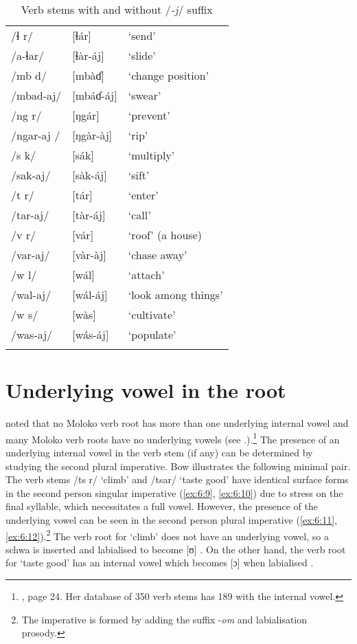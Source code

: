 \begin{table}
\begin{tabular}{lll}
/ɬ r/ & [ɬár] & ‘send’\\
/a-ɬar/ & [ɬàr-áj] & ‘slide’\\

/mb d/ & [mbàɗ] & ‘change position’\\
/mbad-aj/ & [mbáɗ-áj] & ‘swear’\\

/ng r/ & [ŋgár] & ‘prevent’\\
/ngar-aj / & [ŋgàr-àj] & ‘rip’\\

/s k/ & [sák] & ‘multiply’\\
/sak-aj/ & [sàk-áj] & ‘sift’\\

/t r/ & [tár] & ‘enter’\\
/tar-aj/ & [tàr-áj] & ‘call’\\

/v r/ & [vár] & ‘roof’ (a house)\\
/var-aj/ & [vàr-àj] & ‘chase away’\\

/w l/ & [wál] & ‘attach’\\
/wal-aj/ & [wál-áj] & ‘look among things’\\

/w s/ & [wàs] & ‘cultivate’\\
/was-aj/ & [wás-áj] & ‘populate’\\
\lspbottomrule
\end{tabular}
\caption{Verb stems with and without /\textit{-j}/ suffix\label{tab:40}}
\end{table}

\section{Underlying vowel in the root}\label{sec:6.4}
\hypertarget{RefHeading1211961525720847}{}
\largerpage \citet{Bow1997c} noted that no Moloko verb root has more than one underlying internal vowel and many Moloko verb roots have no underlying vowels (see .).\footnote{\citealt{Bow1997c}, page 24. Her database of 350 verb stems has 189 with the internal vowel.}  The presence of an underlying internal vowel in the verb stem (if any) can be determined by studying the second plural imperative. Bow illustrates the following minimal pair. The verb stems  /ts r/ ‘climb’ and /tsar/ ‘taste good’ have identical surface forms in the second person singular imperative (\ref{ex:6:9}, \ref{ex:6:10}) due to stress on the final syllable, which necessitates a full vowel. However, the presence of the underlying vowel can be seen in the second person plural imperative (\ref{ex:6:11}, \ref{ex:6:12}).\footnote{The {\twoP} imperative is formed by adding the suffix -\textit{om} and labialisation prosody.} The verb root for ‘climb’ does not have an underlying vowel, so a schwa is inserted and labialised to become [ʊ] . On the other hand, the verb root for ‘taste good’ has an internal vowel which becomes [ɔ] when labialised .

